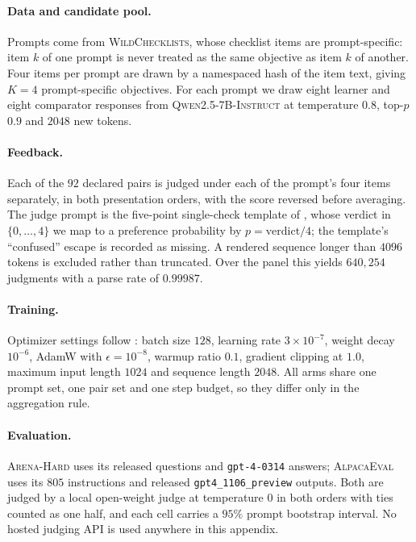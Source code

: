 \documentclass{article}
\theoremstyle{remark}
\theoremstyle{plain}
\begin{document}
\paragraph{Data and candidate pool.}
Prompts come from \textsc{WildChecklists}, whose checklist items are
prompt-specific: item $k$ of one prompt is never treated as the same objective
as item $k$ of another. Four items per prompt are drawn by a namespaced hash of
the item text, giving $K=4$ prompt-specific objectives. For each prompt we draw
eight learner and eight comparator responses from
\textsc{Qwen2.5-7B-Instruct} at temperature $0.8$, top-$p$ $0.9$ and $2048$ new
tokens.

\paragraph{Feedback.}
Each of the $92$ declared pairs is judged under each of the prompt's four items
separately, in both presentation orders, with the score reversed before
averaging. The judge prompt is the five-point single-check template of
\citet{zhang2026prosper}, whose verdict in $\{0,\dots,4\}$ we map to a
preference probability by $p=\text{verdict}/4$; the template's ``confused''
escape is recorded as missing. A rendered sequence longer than $4096$ tokens is
excluded rather than truncated. Over the panel this yields $640{,}254$ judgments
with a parse rate of $0.99987$.

\paragraph{Training.}
Optimizer settings follow \citet{zhang2026prosper}: batch size $128$,
learning rate $3\times10^{-7}$, weight decay $10^{-6}$, AdamW with
$\epsilon=10^{-8}$, warmup ratio $0.1$, gradient clipping at $1.0$, maximum
input length $1024$ and sequence length $2048$. All arms share one prompt set,
one pair set and one step budget, so they differ only in the aggregation rule.

\paragraph{Evaluation.}
\textsc{Arena-Hard} uses its released questions and \texttt{gpt-4-0314} answers;
\textsc{AlpacaEval} uses its $805$ instructions and released
\texttt{gpt4\_1106\_preview} outputs. Both are judged by a local open-weight
judge at temperature $0$ in both orders with ties counted as one half, and each
cell carries a $95\%$ prompt bootstrap interval. No hosted judging API is used
anywhere in this appendix.
\end{document}
